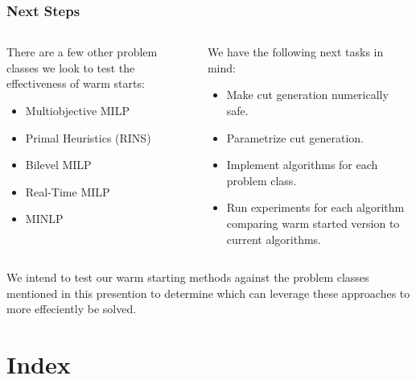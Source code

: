 \documentclass{beamer}
\begin{document}
	\begin{frame}[t]
		\frametitle{Next Steps}
		\small
		\begin{columns}[T]
			\begin{column}{0.45\textwidth}
				There are a few other problem classes we look to test the effectiveness of warm starts:
				\begin{itemize}
					\item Multiobjective MILP
					\item Primal Heuristics (RINS)
					\item Bilevel MILP
					\item Real-Time MILP
					\item MINLP
				\end{itemize}
			\end{column}
			\begin{column}{0.45\textwidth}
				We have the following next tasks in mind:
				\begin{itemize}
					\item Make cut generation numerically safe.
					\item Parametrize cut generation.
					\item Implement algorithms for each problem class.
					\item Run experiments for each algorithm comparing warm started version to current algorithms.
				\end{itemize}
			\end{column}
		\end{columns}
		\begin{block}{}
			We intend to test our warm starting methods against the problem classes mentioned in this presention to determine which can leverage these approaches to more effeciently be solved.
		\end{block}
		\normalsize
	\end{frame}

	\section{Index}
\end{document}
